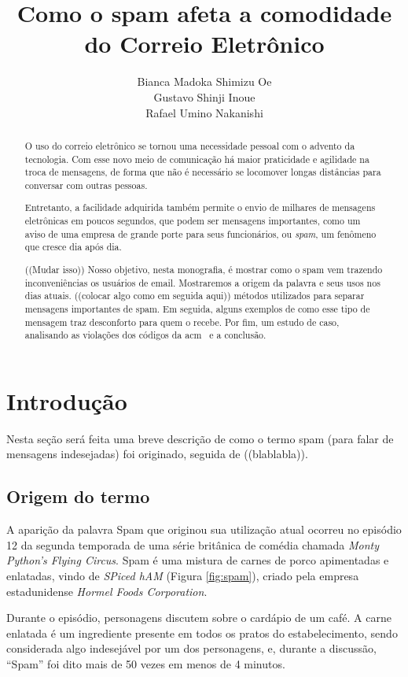 \documentclass[a4paper,dvipdfm]{article}
\title{Como o spam afeta a comodidade do Correio Eletrônico}
\author{Bianca Madoka Shimizu Oe\\
		Gustavo Shinji Inoue\\
		Rafael Umino Nakanishi}
\begin{document}
\maketitle

\begin{abstract}
	O uso do correio eletrônico se tornou uma necessidade pessoal com o advento da tecnologia. Com esse novo meio de comunicação há maior praticidade e agilidade na troca de mensagens, de forma que não é necessário se locomover longas distâncias para conversar com outras pessoas.

	Entretanto, a facilidade adquirida também permite o envio de milhares de mensagens eletrônicas em poucos segundos, que podem ser mensagens importantes, como um aviso de uma empresa de grande porte para seus funcionários, ou \emph{spam}, um fenômeno que cresce dia após dia.

	((Mudar isso))
	Nosso objetivo, nesta monografia, é mostrar como o spam vem trazendo inconveniências os usuários de \gls{email}.
	Mostraremos a origem da palavra e seus usos nos dias atuais. 
	((colocar algo como em seguida aqui)) métodos utilizados para separar mensagens importantes de spam.
	Em seguida, alguns exemplos de como esse tipo de mensagem traz desconforto para quem o recebe. 
	Por fim, um estudo de caso, analisando as violações dos códigos da \gls{acm}~\cite{ACM} e a conclusão.
\end{abstract}

\newpage

\tableofcontents
\newpage


\section{Introdução}
	Nesta seção será feita uma breve descrição de como o termo spam (para falar de mensagens indesejadas) foi originado, seguida de ((blablabla)).

	\subsection{Origem do termo}
		A aparição da palavra Spam que originou sua utilização atual ocorreu no episódio 12 da segunda temporada de uma série britânica de comédia chamada \emph{Monty Python's Flying Circus}. 
		Spam é uma mistura de carnes de porco apimentadas e enlatadas, vindo de \emph{SPiced hAM} (Figura \ref{fig:spam}), criado pela empresa estadunidense \emph{Hormel Foods Corporation}.

		Durante o episódio, personagens discutem sobre o cardápio de um café. 
		A carne enlatada é um ingrediente presente em todos os pratos do estabelecimento, sendo considerada algo indesejável por um dos personagens, e, durante a discussão, ``Spam'' foi dito mais de 50 vezes em menos de 4 minutos.
\end{document}
